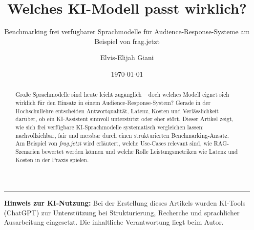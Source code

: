 \documentclass[%
   final,%
   paper=a4,%
   pagesize=auto,%
   fontsize=10pt,%
   twocolumn,%
   version=last,%
   parskip=half%
]{scrartcl}
\author{Elvis-Elijah Giani}
\title{Welches KI-Modell passt wirklich?}
\subtitle{Benchmarking frei verfügbarer Sprachmodelle für Audience-Response-Systeme am Beispiel von frag.jetzt}
\date{\today}
\begin{document}
\maketitle

\begin{abstract}
\noindent
Große Sprachmodelle sind heute leicht zugänglich – doch welches Modell eignet sich wirklich für den Einsatz in einem Audience-Response-System? Gerade in der Hochschullehre entscheiden Antwortqualität, Latenz, Kosten und Verlässlichkeit darüber, ob ein KI-Assistent sinnvoll unterstützt oder eher stört. Dieser Artikel zeigt, wie sich frei verfügbare KI-Sprachmodelle systematisch vergleichen lassen: nachvollziehbar, fair und messbar durch einen strukturierten Benchmarking-Ansatz. Am Beispiel von \emph{frag.jetzt} wird erläutert, welche Use-Cases relevant sind, wie RAG-Szenarien bewertet werden können und welche Rolle Leistungsmetriken wie Latenz und Kosten in der Praxis spielen.
\end{abstract}



\printbibliography[title=Quellen und weiterführende Literatur]

\vspace{1em}
\noindent\rule{\columnwidth}{0.4pt}
{\footnotesize\textbf{Hinweis zur KI-Nutzung:} Bei der Erstellung dieses Artikels wurden KI-Tools (ChatGPT) zur Unterstützung bei Strukturierung, Recherche und sprachlicher Ausarbeitung eingesetzt. Die inhaltliche Verantwortung liegt beim Autor.}
\end{document}
